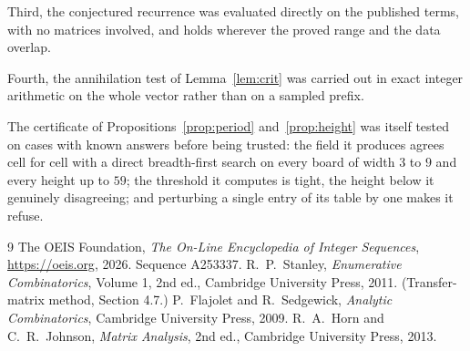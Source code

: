 \documentclass[11pt,a4paper]{article}
\theoremstyle{plain}
\theoremstyle{definition}
\begin{document}
Third, the conjectured recurrence was evaluated directly on the published terms, with no
matrices involved, and holds wherever the proved range and the data overlap.

Fourth, the annihilation test of Lemma~\ref{lem:crit} was carried out in exact integer
arithmetic on the whole vector rather than on a sampled prefix.

The certificate of Propositions~\ref{prop:period} and~\ref{prop:height} was itself tested
on cases with known answers before being trusted: the field it produces agrees cell for cell
with a direct breadth-first search on every board of width $3$ to $9$ and every height up to
$59$; the threshold it computes is tight, the height below it genuinely disagreeing; and
perturbing a single entry of its table by one makes it refuse.

\begin{thebibliography}{9}
 The OEIS Foundation, \emph{The On-Line Encyclopedia of Integer
Sequences}, \url{https://oeis.org}, 2026. Sequence A253337.
 R.~P.~Stanley, \emph{Enumerative Combinatorics}, Volume 1, 2nd ed.,
Cambridge University Press, 2011. (Transfer-matrix method, Section 4.7.)
 P.~Flajolet and R.~Sedgewick, \emph{Analytic Combinatorics}, Cambridge
University Press, 2009.
 R.~A.~Horn and C.~R.~Johnson, \emph{Matrix Analysis}, 2nd ed., Cambridge
University Press, 2013.
\end{thebibliography}
\end{document}
